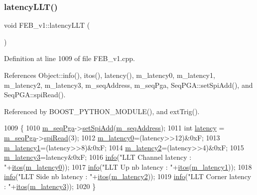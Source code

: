 \subsubsection{\texorpdfstring{latency\+L\+L\+T()}{latencyLLT()}}
{\footnotesize\ttfamily void F\+E\+B\+\_\+v1\+::latency\+L\+LT (\begin{DoxyParamCaption}{ }\end{DoxyParamCaption})}



Definition at line 1009 of file F\+E\+B\+\_\+v1.\+cpp.



References Object\+::info(), itos(), latency(), m\+\_\+latency0, m\+\_\+latency1, m\+\_\+latency2, m\+\_\+latency3, m\+\_\+seq\+Address, m\+\_\+seq\+Pga, Seq\+P\+G\+A\+::set\+Spi\+Add(), and Seq\+P\+G\+A\+::spi\+Read().



Referenced by B\+O\+O\+S\+T\+\_\+\+P\+Y\+T\+H\+O\+N\+\_\+\+M\+O\+D\+U\+L\+E(), and ext\+Trig().


\begin{DoxyCode}
1009                        \{
1010   \hyperlink{classFEB__v1_a6c7804ac86796f233a8393043adf2e77}{m\_seqPga}->\hyperlink{classSeqPGA_ac998ce3a6d9b5f2e88cc8393f8c1df53}{setSpiAdd}(\hyperlink{classFEB__v1_a1c1eb093fd1733b9510fcf8bc5c7ad08}{m\_seqAddress});
1011   \textcolor{keywordtype}{int} \hyperlink{classFEB__v1_a68050d232efd8d6568910b09a2c18f62}{latency} = \hyperlink{classFEB__v1_a6c7804ac86796f233a8393043adf2e77}{m\_seqPga}->\hyperlink{classSeqPGA_ab3d0e5e5d4014bc7a92588a76b8713d4}{spiRead}(3);
1012   \hyperlink{classFEB__v1_a23a3d8bfbf96490890140f13b08a02c1}{m\_latency0}=(latency>>12)&0xF;
1013   \hyperlink{classFEB__v1_a026d2f4973bf3ddbc404e35264fdef1f}{m\_latency1}=(latency>>8)&0xF;
1014   \hyperlink{classFEB__v1_a2c4b18efd76de3bf7089bba57fb6744f}{m\_latency2}=(latency>>4)&0xF;
1015   \hyperlink{classFEB__v1_a2f71bdcef05c845177a62610da490bf9}{m\_latency3}=latency&0xF;
1016   \hyperlink{classObject_a644fd329ea4cb85f54fa6846484b84a8}{info}(\textcolor{stringliteral}{"LLT Channel latency : "}+\hyperlink{Tools_8h_af330027dbdafb9a30768b3613c553e60}{itos}(\hyperlink{classFEB__v1_a23a3d8bfbf96490890140f13b08a02c1}{m\_latency0}));
1017   \hyperlink{classObject_a644fd329ea4cb85f54fa6846484b84a8}{info}(\textcolor{stringliteral}{"LLT Up nb   latency : "}+\hyperlink{Tools_8h_af330027dbdafb9a30768b3613c553e60}{itos}(\hyperlink{classFEB__v1_a026d2f4973bf3ddbc404e35264fdef1f}{m\_latency1}));
1018   \hyperlink{classObject_a644fd329ea4cb85f54fa6846484b84a8}{info}(\textcolor{stringliteral}{"LLT Side nb latency : "}+\hyperlink{Tools_8h_af330027dbdafb9a30768b3613c553e60}{itos}(\hyperlink{classFEB__v1_a2c4b18efd76de3bf7089bba57fb6744f}{m\_latency2}));
1019   \hyperlink{classObject_a644fd329ea4cb85f54fa6846484b84a8}{info}(\textcolor{stringliteral}{"LLT Corner  latency : "}+\hyperlink{Tools_8h_af330027dbdafb9a30768b3613c553e60}{itos}(\hyperlink{classFEB__v1_a2f71bdcef05c845177a62610da490bf9}{m\_latency3}));
1020 \}
\end{DoxyCode}
\mbox{\label{classFEB__v1_a14807bfa77f92bb82428c39abea5df88}} 
